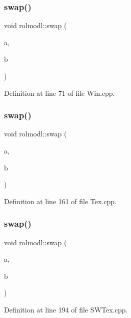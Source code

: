 \subsubsection{\texorpdfstring{swap()}{swap()}\hspace{0.1cm}{\footnotesize\ttfamily [3/5]}}
{\footnotesize\ttfamily void rolmodl\+::swap (\begin{DoxyParamCaption}\item[{\mbox{\hyperlink{classrolmodl_1_1_win___base}{Win\+\_\+\+Base}} \&}]{a,  }\item[{\mbox{\hyperlink{classrolmodl_1_1_win___base}{Win\+\_\+\+Base}} \&}]{b }\end{DoxyParamCaption})\hspace{0.3cm}{\ttfamily [noexcept]}}



Definition at line 71 of file Win.\+cpp.

\mbox{\label{namespacerolmodl_a5839822387bac1c9fad165e961afdf41}} 
\subsubsection{\texorpdfstring{swap()}{swap()}\hspace{0.1cm}{\footnotesize\ttfamily [4/5]}}
{\footnotesize\ttfamily void rolmodl\+::swap (\begin{DoxyParamCaption}\item[{Tex\+Lock \&}]{a,  }\item[{Tex\+Lock \&}]{b }\end{DoxyParamCaption})\hspace{0.3cm}{\ttfamily [noexcept]}}



Definition at line 161 of file Tex.\+cpp.

\mbox{\label{namespacerolmodl_a127e66db8b178a299aec5f25b6df83a9}} 
\subsubsection{\texorpdfstring{swap()}{swap()}\hspace{0.1cm}{\footnotesize\ttfamily [5/5]}}
{\footnotesize\ttfamily void rolmodl\+::swap (\begin{DoxyParamCaption}\item[{\mbox{\hyperlink{classrolmodl_1_1_s_w_tex___r_l_e_lock}{S\+W\+Tex\+\_\+\+R\+L\+E\+Lock}} \&}]{a,  }\item[{\mbox{\hyperlink{classrolmodl_1_1_s_w_tex___r_l_e_lock}{S\+W\+Tex\+\_\+\+R\+L\+E\+Lock}} \&}]{b }\end{DoxyParamCaption})\hspace{0.3cm}{\ttfamily [noexcept]}}



Definition at line 194 of file S\+W\+Tex.\+cpp.

